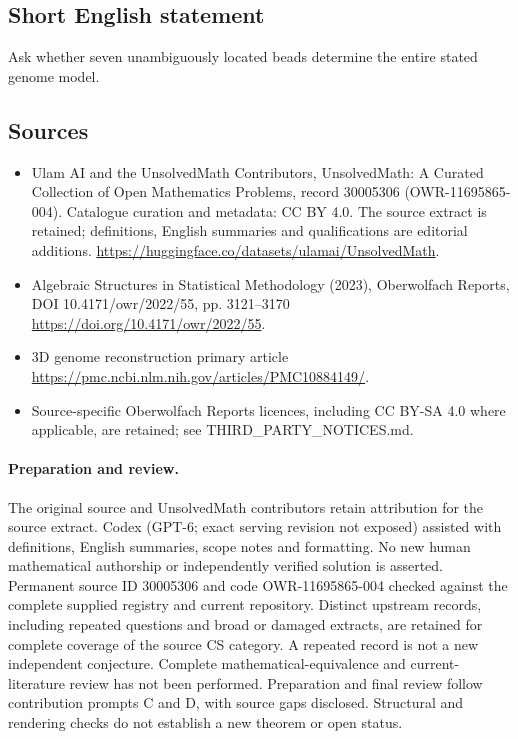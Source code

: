 \documentclass[11pt]{article}
\begin{document}
\subsection{Short English statement}
Ask whether seven unambiguously located beads determine the entire stated genome model.
\subsection{Sources}
\begin{itemize}
\item[\hypertarget{source:30005306:1}{S1}] Ulam AI and the UnsolvedMath Contributors, UnsolvedMath: A Curated Collection of Open Mathematics Problems, record 30005306 (OWR-11695865-004). Catalogue curation and metadata: CC BY 4.0. The source extract is retained; definitions, English summaries and qualifications are editorial additions.
\url{https://huggingface.co/datasets/ulamai/UnsolvedMath}.
\item[\hypertarget{source:30005306:2}{S2}] Algebraic Structures in Statistical Methodology (2023), Oberwolfach Reports, DOI 10.4171/owr/2022/55, pp. 3121--3170
\url{https://doi.org/10.4171/owr/2022/55}.
\item[\hypertarget{source:30005306:3}{S3}] 3D genome reconstruction primary article
\url{https://pmc.ncbi.nlm.nih.gov/articles/PMC10884149/}.
\item Source-specific Oberwolfach Reports licences, including CC BY-SA 4.0 where applicable, are retained; see THIRD\_PARTY\_NOTICES.md.
\end{itemize}
\paragraph{Preparation and review.}
The original source and UnsolvedMath contributors retain attribution for the source extract. Codex (GPT-6; exact serving revision not exposed) assisted with definitions, English summaries, scope notes and formatting. No new human mathematical authorship or independently verified solution is asserted. Permanent source ID 30005306 and code OWR-11695865-004 checked against the complete supplied registry and current repository. Distinct upstream records, including repeated questions and broad or damaged extracts, are retained for complete coverage of the source CS category. A repeated record is not a new independent conjecture. Complete mathematical-equivalence and current-literature review has not been performed. Preparation and final review follow contribution prompts C and D, with source gaps disclosed. Structural and rendering checks do not establish a new theorem or open status.
\label{end:30005306}
\end{document}
